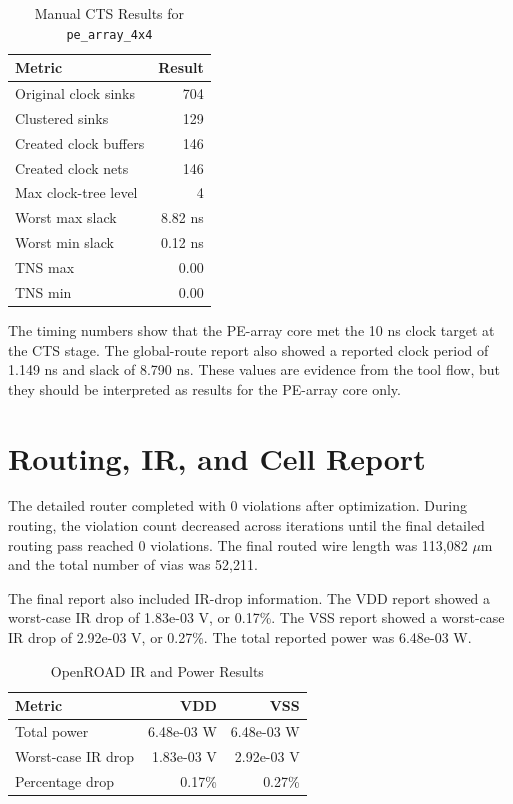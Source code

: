 \documentclass[conference]{IEEEtran}
\begin{document}
\begin{table}[h]
\centering
\caption{Manual CTS Results for \texttt{pe\_array\_4x4}}
\label{tab:cts}
\begin{tabular}{lr}
\toprule
Metric & Result \\
\midrule
Original clock sinks & 704 \\
Clustered sinks & 129 \\
Created clock buffers & 146 \\
Created clock nets & 146 \\
Max clock-tree level & 4 \\
Worst max slack & 8.82 ns \\
Worst min slack & 0.12 ns \\
TNS max & 0.00 \\
TNS min & 0.00 \\
\bottomrule
\end{tabular}
\end{table}

The timing numbers show that the PE-array core met the 10 ns clock target at the CTS stage. The global-route report also showed a reported clock period of 1.149 ns and slack of 8.790 ns. These values are evidence from the tool flow, but they should be interpreted as results for the PE-array core only.

\section{Routing, IR, and Cell Report}

The detailed router completed with 0 violations after optimization. During routing, the violation count decreased across iterations until the final detailed routing pass reached 0 violations. The final routed wire length was 113,082 $\mu$m and the total number of vias was 52,211.

The final report also included IR-drop information. The VDD report showed a worst-case IR drop of 1.83e-03 V, or 0.17\%. The VSS report showed a worst-case IR drop of 2.92e-03 V, or 0.27\%. The total reported power was 6.48e-03 W.

\begin{table}[h]
\centering
\caption{OpenROAD IR and Power Results}
\label{tab:ir}
\begin{tabular}{lrr}
\toprule
Metric & VDD & VSS \\
\midrule
Total power & 6.48e-03 W & 6.48e-03 W \\
Worst-case IR drop & 1.83e-03 V & 2.92e-03 V \\
Percentage drop & 0.17\% & 0.27\% \\
\bottomrule
\end{tabular}
\end{table}
\end{document}
